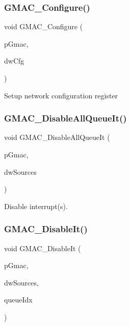 \subsubsection{\texorpdfstring{GMAC\_Configure()}{GMAC\_Configure()}}
{\footnotesize\ttfamily void G\+M\+A\+C\+\_\+\+Configure (\begin{DoxyParamCaption}\item[{\mbox{\hyperlink{structGmac}{Gmac}} $\ast$}]{p\+Gmac,  }\item[{uint32\+\_\+t}]{dw\+Cfg }\end{DoxyParamCaption})}

Setup network configuration register \mbox{\label{group__gmac__defines_gae03425042713a644dbec300e14ea4d6d}} 
\subsubsection{\texorpdfstring{GMAC\_DisableAllQueueIt()}{GMAC\_DisableAllQueueIt()}}
{\footnotesize\ttfamily void G\+M\+A\+C\+\_\+\+Disable\+All\+Queue\+It (\begin{DoxyParamCaption}\item[{\mbox{\hyperlink{structGmac}{Gmac}} $\ast$}]{p\+Gmac,  }\item[{uint32\+\_\+t}]{dw\+Sources }\end{DoxyParamCaption})}

Disable interrupt(s). \mbox{\label{group__gmac__defines_ga6c39b23fa0f7760458941d6a5bf90669}} 
\subsubsection{\texorpdfstring{GMAC\_DisableIt()}{GMAC\_DisableIt()}}
{\footnotesize\ttfamily void G\+M\+A\+C\+\_\+\+Disable\+It (\begin{DoxyParamCaption}\item[{\mbox{\hyperlink{structGmac}{Gmac}} $\ast$}]{p\+Gmac,  }\item[{uint32\+\_\+t}]{dw\+Sources,  }\item[{gmac\+Que\+List\+\_\+t}]{queue\+Idx }\end{DoxyParamCaption})}

